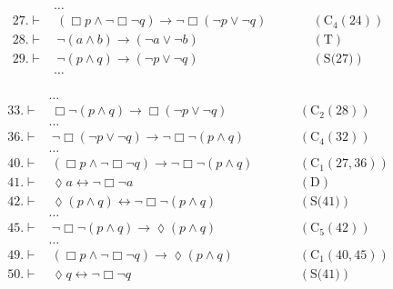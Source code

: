 \documentclass[a4paper, 12pt]{report}
\begin{document}
{{\begin{equation*}
\begin{alignedat}{2}
                               & \ldots && \\
                    27. \vdash & \ (\Box p \land \lnot \Box \lnot q) \to \lnot \Box (\lnot p \lor \lnot q) && \quad \quad (\mbox{C}_4(24)) \\
                    28. \vdash & \ \lnot (a \land b) \to (\lnot a \lor \lnot b) && \quad \quad (\mbox{T}) \\
                    29. \vdash & \ \lnot (p \land q) \to (\lnot p \lor \lnot q) && \quad \quad (\mbox{S(27)}) \\
                               & \ldots && \\
                \end{alignedat}
            \end{equation*}

            \begin{equation*}
                \begin{alignedat}{2}
                    & \ldots && \\
                    33. \vdash & \ \Box \lnot (p \land q) \to \Box (\lnot p \lor \lnot q) && \quad \quad (\mbox{C}_2(28)) \\
                               & \ldots && \\
                    36. \vdash & \ \lnot \Box(\lnot p \lor \lnot q) \to \lnot \Box \lnot (p \land q) && \quad \quad (\mbox{C}_4(32)) \\
                               & \ldots && \\
                    40. \vdash & \ (\Box p \land \lnot \Box \lnot q) \to \lnot \Box \lnot (p \land q) && \quad \quad (\mbox{C}_1(27, 36)) \\
                    41. \vdash & \ \lozenge a \leftrightarrow \lnot \Box \lnot a && \quad \quad (\mbox{D}) \\
                    42. \vdash & \ \lozenge(p \land q) \leftrightarrow \lnot \Box \lnot (p \land q) && \quad \quad (\mbox{S(41)}) \\
                               & \ldots && \\
                    45. \vdash & \ \lnot \Box \lnot (p \land q) \to \lozenge(p \land q) &&\quad \quad (\mbox{C}_5(42)) \\
                               & \ldots && \\
                    49. \vdash & \ (\Box p \land \lnot \Box \lnot q) \to \lozenge(p \land q) && \quad \quad (\mbox{C}_1(40, 45)) \\
                    50. \vdash & \ \lozenge q \leftrightarrow \lnot \Box \lnot q && \quad \quad (\mbox{S(41)}) \\

\end{alignedat}
\end{equation*}}}
\end{document}
